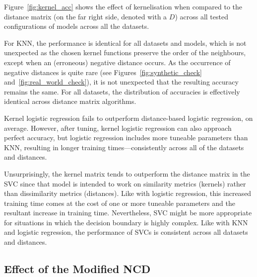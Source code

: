 \documentclass[preprint,12pt]{article}
\begin{document}
Figure~\ref{fig:kernel_acc} shows the effect of kernelisation when compared to the distance matrix (on the far right side, denoted with a $D$) across all tested configurations of models across all the datasets.

For KNN, the performance is identical for all datasets and models, which is not unexpected as the chosen kernel functions preserve the order of the neighbours, except when an (erroneous) negative distance occurs.
As the occurrence of negative distances is quite rare (see Figures~\ref{fig:synthetic_check} and~\ref{fig:real_world_check}), it is not unexpected that the resulting accuracy remains the same.
For all datasets, the distribution of accuracies is effectively identical across distance matrix algorithms.

Kernel logistic regression fails to outperform distance-based logistic regression, on average.
However, after tuning, kernel logistic regression can also approach perfect accuracy, but logistic regression includes more tuneable parameters than KNN, resulting in longer training times---consistently across all of the datasets and distances.

Unsurprisingly, the kernel matrix tends to outperform the distance matrix in the SVC since that model is intended to work on similarity metrics (kernels) rather than dissimilarity metrics (distances).
Like with logistic regression, this increased training time comes at the cost of one or more tuneable parameters and the resultant increase in training time.
Nevertheless, SVC might be more appropriate for situations in which the decision boundary is highly complex.
Like with KNN and logistic regression, the performance of SVCs is consistent across all datasets and distances.



\subsection{Effect of the Modified NCD}
\end{document}
